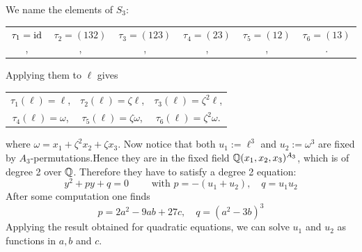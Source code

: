 \documentclass[twoside = false,	%
		headsepline,		%
		parskip = true,
		]{scrbook}						%
\begin{document}
            
            We name the elements of $S_3$:
            \begin{center}
                \begin{tabular}{cccccc}
                    $\tau_1=\mathrm{id}$,& $\tau_2=(132)$, &$\tau_3=(123)$, &$\tau_4=(23)$, &$\tau_5=(12)$, &$\tau_6=(13)$.
                \end{tabular}
            \end{center}

            Applying them to $\ell$ gives 
            \begin{center}
            \begin{tabular}{ccc}
                $\tau_1(\ell)=\ell$,& $\tau_2(\ell)=\zeta\ell$, &$\tau_3(\ell)=\zeta^2\ell$, \\
                $\tau_4(\ell)=\omega$, &$\tau_5(\ell)=\zeta\omega$, &$\tau_6(\ell)=\zeta^2\omega$.
            \end{tabular}
            \end{center}

            where $\omega=x_1+\zeta^2x_2+\zeta x_3$. Now notice that both $u_1:=\ell^3$ and $u_2:=\omega^3$ are fixed by $A_3$-permutations.Hence they are in the fixed field $\mathbb Q(x_1,x_2,x_3)^{A_3}$, which is of degree 2 over $\mathbb Q$. Therefore they have to satisfy a degree 2 equation:
            $$y^2+py+q=0 \qquad \text{ with } p=-(u_1+u_2),\quad q=u_1u_2$$
            After some computation one finds
            $$p=2a^2-9ab+27c, \quad q=(a^2-3b)^3$$
            Applying the result obtained for quadratic equations, we can solve $u_1$ and $u_2$ as functions in $a,b$ and $c$.
            
\end{document}
